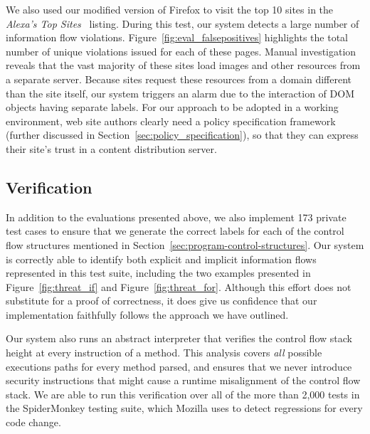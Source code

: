 \documentclass[preprint]{sigplanconf}
\begin{document}
We also used our modified version of Firefox to visit the top 10 sites in the \textit{Alexa's Top Sites}~\cite{alexa} listing.
During this test, our system detects a large number of information flow violations.
Figure~\ref{fig:eval_falsepositives} highlights the total number of unique violations issued for each of these pages.
Manual investigation reveals that the vast majority of these sites load images and other resources from a separate server.
Because sites request these resources from a domain different than the site itself, our system triggers an alarm due to the interaction of DOM objects having separate labels.
For our approach to be adopted in a working environment, web site authors clearly need a policy specification framework (further discussed in Section~\ref{sec:policy_specification}), so that they can express their site's trust in a content distribution server.

\subsection{Verification}

In addition to the evaluations presented above, we also implement 173 private test cases to ensure that we generate the correct labels for each of the control flow structures mentioned in Section~\ref{sec:program-control-structures}.
Our system is correctly able to identify both explicit and implicit information flows represented in this test suite, including the two examples presented in Figure~\ref{fig:threat_if} and Figure~\ref{fig:threat_for}.
Although this effort does not substitute for a proof of correctness, it does give us confidence that our implementation faithfully follows the approach we have outlined.

Our system also runs an abstract interpreter that verifies the control flow stack height at every instruction of a method.
This analysis covers \emph{all} possible executions paths for every method parsed, and ensures that we never introduce security instructions that might cause a runtime misalignment of the control flow stack.
We are able to run this verification over all of the more than 2,000 tests in the SpiderMonkey testing suite, which Mozilla uses to detect regressions for every code change.


\end{document}
